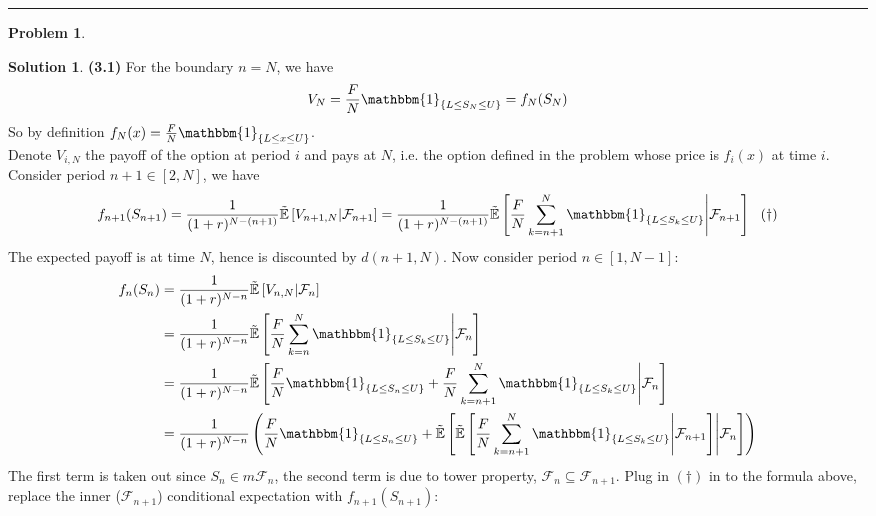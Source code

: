 \documentclass[a4paper, 10pt]{article}
\theoremstyle{definition}
\newtheorem{problem}{Problem}
\theoremstyle{hSol}
\newtheorem*{solution}{Solution}
\begin{document}
\noindent\rule{16cm}{0.4pt}
\begin{problem} 
\end{problem}
\begin{solution} \textbf{(3.1)} For the boundary $n=N$, we have
\begin{equation}
  V_N = \frac{F}{N} \mathbbm{1}_{\{L \leq S_N \leq U\}} = f_N(S_N)
\end{equation}
So by definition $f_N(x) = \frac{F}{N} \mathbbm{1}_{\{L \leq x \leq U\}}$. \\
Denote $V_{i, N}$ the payoff of the option at period $i$ and pays at $N$, i.e. the option defined in the problem whose price is $f_i(x)$ at time $i$. Consider period $n+1 \in [2, N]$, we have
\begin{equation}
  f_{n+1}(S_{n+1}) = \frac{1}{(1+r)^{N-(n+1)}}\tilde{\mathbb{E}}\left[V_{n+1, N}\middle|\mathcal{F}_{n+1}\right] = \frac{1}{(1+r)^{N-(n+1)}}\tilde{\mathbb{E}}\left[\frac{F}{N}\sum_{k=n+1}^N \mathbbm{1}_{\{L\leq S_k \leq U\}}\middle|\mathcal{F}_{n+1}\right]~~(\dag)
\end{equation}
The expected payoff is at time $N$, hence is discounted by $d(n+1, N)$. Now consider period $n \in [1, N-1]$:
\begin{equation}
  \begin{split}
      f_{n}(S_{n}) &= \frac{1}{(1+r)^{N-n}}\tilde{\mathbb{E}}\left[V_{n, N}\middle|\mathcal{F}_{n}\right] \\
      &= \frac{1}{(1+r)^{N-n}}\tilde{\mathbb{E}}\left[\frac{F}{N}\sum_{k=n}^N \mathbbm{1}_{\{L\leq S_k \leq U\}}\middle|\mathcal{F}_{n}\right] \\
      &= \frac{1}{(1+r)^{N-n}}\tilde{\mathbb{E}}\left[\frac{F}{N}\mathbbm{1}_{\{L\leq S_n\leq U\}} + \frac{F}{N}\sum_{k=n+1}^N \mathbbm{1}_{\{L\leq S_k \leq U\}}\middle|\mathcal{F}_{n}\right] \\
      &= \frac{1}{(1+r)^{N-n}}\left(\frac{F}{N}\mathbbm{1}_{\{L\leq S_n\leq U\}} +\tilde{\mathbb{E}}\left[\tilde{\mathbb{E}}\left[\frac{F}{N}\sum_{k=n+1}^N \mathbbm{1}_{\{L\leq S_k \leq U\}}\middle|\mathcal{F}_{n+1}\right]\middle|\mathcal{F}_{n}\right]\right) \\
  \end{split}
\end{equation}
The first term is taken out since $S_n\in m \mathcal{F}_n$, the second term is due to tower property, $\mathcal{F}_n \subseteq \mathcal{F}_{n+1}$. Plug in $(\dag)$ in to the formula above, replace the inner ($\mathcal{F}_{n+1}$) conditional expectation with $f_{n+1}(S_{n+1})$:

\end{solution}
\end{document}
